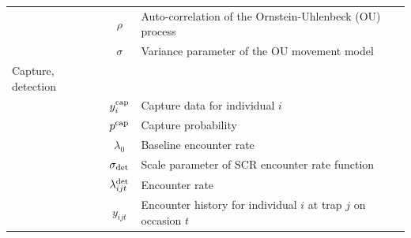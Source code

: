 \documentclass[12pt]{article}
\begin{document}
\begin{table}[h!]
\begin{tabular}{p{3.5cm}cp{11cm}}
                            & $\rho$                    & Auto-correlation of the Ornstein-Uhlenbeck (OU) process                           \\
                            & $\sigma$                  & Variance parameter of the OU movement model                                       \\
    Capture, detection      &                           &                                                                                   \\
                            & $y^{\rm cap}_i$           & Capture data for individual $i$                                                   \\
                            & $p^{\rm cap}$             & Capture probability                                                               \\
                            & $\lambda_0$               & Baseline encounter rate                                                           \\
                            & $\sigma_{\rm det}$        & Scale parameter of SCR encounter rate function                                    \\
                            & $\lambda^{\rm det}_{ijt}$ & Encounter rate                                                                    \\
                            & $y_{ijt}$                 & Encounter history for individual $i$ at trap $j$ on occasion $t$                  \\
    \hline
  \end{tabular}
  \label{tab:defs}
\end{table}


\clearpage
\end{document}
